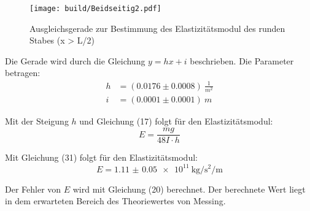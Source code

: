 \begin{figure}[H]
  \centering
  \texttt{[image: build/Beidseitig2.pdf]}
  \caption{Ausgleichsgerade zur Bestimmung des Elastizitätsmodul des runden Stabes (x > L/2)}
  \label{fig:Elastizitätsmodul des runden Stabes1}
\end{figure}

Die Gerade wird durch die Gleichung $y = hx + i$ beschrieben. Die Parameter betragen:
\begin{align*}
  h &= (0.0176 \pm 0.0008) \: \frac{1}{m^2} \\
  i &= (0.0001  \pm 0.0001) \: m
\end{align*}

Mit der Steigung $h$ und Gleichung (17) folgt für den Elastizitätsmodul:
\begin{equation}
  E = \frac{mg}{48I \cdot h}
\end{equation}


Mit Gleichung (31) folgt für den Elastizitätsmodul:
\begin{equation}
  E = \SI{1.11(5)e11}{\kilo\gram\per\second\squared\per\meter}
\end{equation}

Der Fehler von $E$ wird mit Gleichung (20) berechnet.
Der berechnete Wert liegt in dem erwarteten Bereich des Theoriewertes von Messing.
